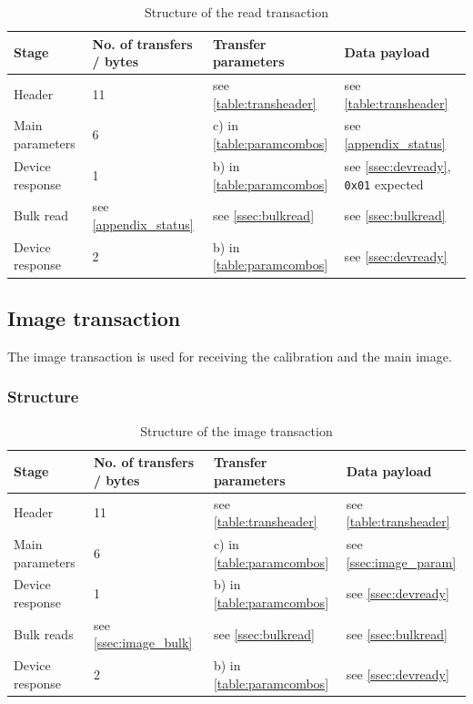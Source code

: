 \documentclass{article}
\begin{document}
\begin{table}[H]
  \caption{Structure of the read transaction}
  \centering
  \begin{tabular}{p{3cm} | p{1.5cm} | p{3cm} | p{3cm}}
    Stage & No. of transfers / bytes & Transfer parameters & Data payload \\ \hline
    
    Header & 11 & see \autoref{table:transheader} & see \autoref{table:transheader} \\
    Main parameters & 6 & c) in \autoref{table:paramcombos} & see \autoref{appendix_status} \\
    Device response & 1 & b) in \autoref{table:paramcombos} & see \autoref{ssec:devready}, {\tt 0x01} expected \\
    Bulk read & see \autoref{appendix_status} & see \autoref{ssec:bulkread} & see \autoref{ssec:bulkread} \\
    Device response & 2 & b) in \autoref{table:paramcombos} & see \autoref{ssec:devready} \\
  \end{tabular}
\end{table}


\subsection{Image transaction}

The image transaction is used for receiving the calibration and the main image.

\subsubsection{Structure}

\begin{table}[H]
  \caption{Structure of the image transaction}
  \centering
  \begin{tabular}{p{3cm} | p{1.5cm} | p{3cm} | p{3cm}}
    Stage & No. of transfers / bytes & Transfer parameters & Data payload \\ \hline
    
    Header & 11 & see \autoref{table:transheader} & see \autoref{table:transheader} \\
    Main parameters & 6 & c) in \autoref{table:paramcombos} & see \autoref{ssec:image_param} \\
    Device response & 1 & b) in \autoref{table:paramcombos} & see \autoref{ssec:devready} \\
    Bulk reads & see \autoref{ssec:image_bulk} & see \autoref{ssec:bulkread} & see \autoref{ssec:bulkread} \\
    Device response & 2 & b) in \autoref{table:paramcombos} & see \autoref{ssec:devready} \\
  \end{tabular}
\end{table}
\end{document}
